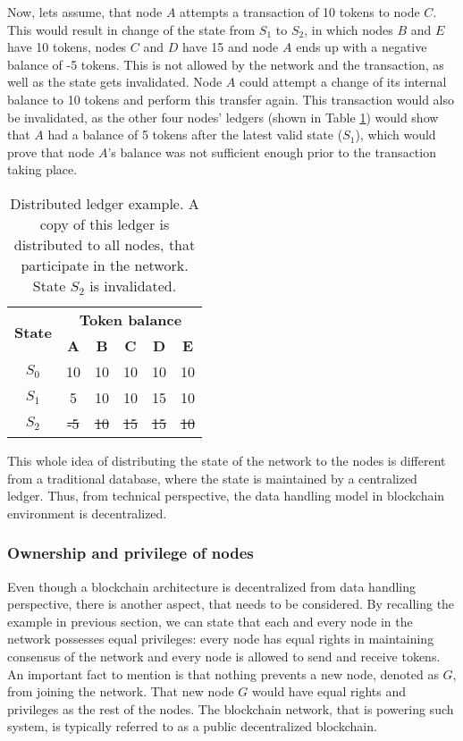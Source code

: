 Now, lets assume, that node $A$ attempts a transaction of 10 tokens to node $C$. This would result in change of the state from $S_1$ to $S_2$, in which nodes $B$ and $E$ have 10 tokens, nodes $C$ and $D$ have 15 and node $A$ ends up with a negative balance of -5 tokens. This is not allowed by the network and the transaction, as well as the state gets invalidated. Node $A$ could attempt a change of its internal balance to 10 tokens and perform this transfer again. This transaction would also be invalidated, as the other four nodes' ledgers (shown in Table \ref{tab:ledgercopy}) would show that $A$ had a balance of 5 tokens after the latest valid state ($S_1$), which would prove that node $A$'s balance was not sufficient enough prior to the transaction taking place. 

\begin{table}[H]
\centering
\begin{tabular}{|c|c|c|c|c|c|}
\hline
\multirow{2}{*}{\textbf{State}} & \multicolumn{5}{c|}{\textbf{Token balance}} \\ \cline{2-6} 
                                & \textbf{A}       & \textbf{B}      & \textbf{C}      & \textbf{D}      & \textbf{E}      \\ \hline
$S_0$                           & 10      & 10     & 10     & 10     & 10     \\ \hline
$S_1$                           & 5       & 10     & 10     & 15     & 10     \\ \hline
\st{$S_2$}                      & \st{-5} & \st{10}& \st{15}& \st{15}& \st{10} \\ \hline
\end{tabular}
 \caption {Distributed ledger example. A copy of this ledger is distributed to all nodes, that participate in the network. State $S_2$ is invalidated.}
 \label{tab:ledgercopy}
\end{table}

This whole idea of distributing the state of the network to the nodes is different from a traditional database, where the state is maintained by a centralized ledger. Thus, from technical perspective, the data handling model in blockchain environment is decentralized.

\subsubsection{Ownership and privilege of nodes} \label{section:ownershipandpriveledge}
Even though a blockchain architecture is decentralized from data handling perspective, there is another aspect, that needs to be considered. By recalling the example in previous section, we can state that each and every node in the network possesses equal privileges: every node has equal rights in maintaining consensus of the network and every node is allowed to send and receive tokens. An important fact to mention is that nothing prevents a new node, denoted as $G$, from joining the network. That new node $G$ would have equal rights and privileges as the rest of the nodes. The blockchain network, that is powering such system, is typically referred to as a public decentralized blockchain.

